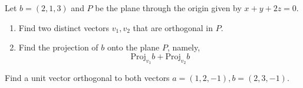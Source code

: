 \documentclass[openany]{book}
\begin{document}
\begin{prob}
    Let $b=(2,1,3)$ and $P$ be the plane through the origin given by $x+y+2z=0$. 
    \begin{enumerate}
        \item[(a)] Find two distinct vectors $v_1,v_2$ that are orthogonal in $P$.
        \item[(b)] Find the projection of $b$ onto the plane $P$, namely, 
        \begin{equation*}
            \text{Proj}_{v_1}b+\text{Proj}_{v_2}b
        \end{equation*}
    \end{enumerate}
\end{prob}


\begin{prob}
    Find a unit vector orthogonal to both vectors $a=(1,2,-1), b=(2,3,-1)$.
\end{prob}
\end{document}
